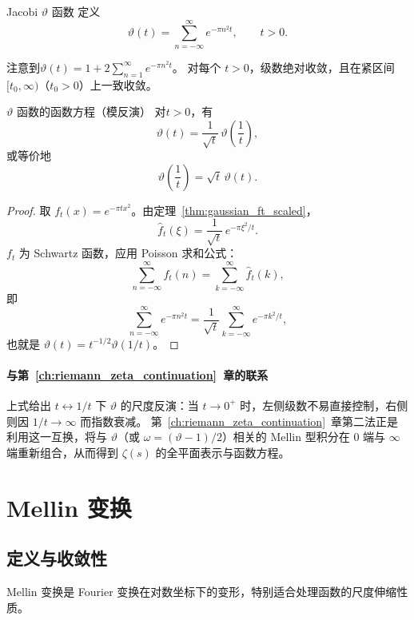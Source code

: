 \begin{definition}{Jacobi $\vartheta$ 函数}{}
定义
\[
\vartheta(t) = \sum_{n=-\infty}^{\infty} e^{-\pi n^2 t}, \qquad t > 0.
\]
\end{definition}

注意到$\vartheta(t) = 1 + 2\sum_{n=1}^{\infty} e^{-\pi n^2 t}$。
对每个 $t>0$，级数绝对收敛，且在紧区间 $[t_0,\infty)$（$t_0>0$）上一致收敛。

\begin{theorem}{$\vartheta$ 函数的函数方程（模反演）}{}
对$t > 0$，有
\[
\vartheta(t) = \frac{1}{\sqrt{t}}\,\vartheta\!\left(\frac{1}{t}\right),
\]
或等价地
\[
\vartheta\!\left(\frac{1}{t}\right) = \sqrt{t}\,\vartheta(t).
\]
\end{theorem}

\begin{proof}
取 $f_t(x)=e^{-\pi t x^2}$。由定理~\ref{thm:gaussian_ft_scaled}，
\[
\hat{f}_t(\xi) = \frac{1}{\sqrt{t}}\, e^{-\pi \xi^2 / t}.
\]
$f_t$ 为 Schwartz 函数，应用 Poisson 求和公式：
\[
\sum_{n=-\infty}^{\infty} f_t(n)
= \sum_{k=-\infty}^{\infty} \hat{f}_t(k),
\]
即
\[
\sum_{n=-\infty}^{\infty} e^{-\pi n^2 t}
= \frac{1}{\sqrt{t}} \sum_{k=-\infty}^{\infty} e^{-\pi k^2 / t},
\]
也就是 $\vartheta(t) = t^{-1/2}\vartheta(1/t)$。
\end{proof}

\paragraph{与第~\ref{ch:riemann_zeta_continuation}~章的联系}
上式给出 $t\leftrightarrow 1/t$ 下 $\vartheta$ 的尺度反演：当 $t\to 0^+$ 时，左侧级数不易直接控制，右侧则因 $1/t\to\infty$ 而指数衰减。
第~\ref{ch:riemann_zeta_continuation}~章第二法正是利用这一互换，将与 $\vartheta$（或 $\omega=(\vartheta-1)/2$）相关的 Mellin 型积分在 $0$ 端与 $\infty$ 端重新组合，从而得到 $\zeta(s)$ 的全平面表示与函数方程。

\section{Mellin 变换}

\subsection{定义与收敛性}

Mellin 变换是 Fourier 变换在对数坐标下的变形，特别适合处理函数的尺度伸缩性质。

